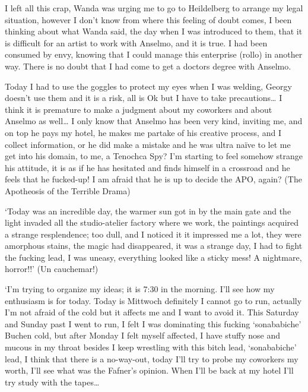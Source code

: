 \documentclass[smalldemyvopaper,11pt,twoside,onecolumn,openright,extrafontsizes]{memoir}
\begin{document}
I left all this crap, Wanda was urging me to go to Heildelberg to arrange my legal situation, however I don’t know from where this feeling of doubt comes, I been thinking about what Wanda said, the day when I was introduced to them, that it is difficult for an artist to work with Anselmo, and it is true. I had been consumed by envy, knowing that I could manage this enterprise (rollo) in another way. There is no doubt that I had come to get a doctors degree with Anselmo.

Today I had to use the goggles to protect my eyes when I was welding, Georgy doesn’t use them and it is a risk, all is Ok but I have to take precautions… I think it is premature to make a judgment about my coworkers and about Anselmo as well… I only know that Anselmo has been very kind, inviting me, and on top he pays my hotel, he makes me partake of his creative process, and I collect information, or he did make a mistake and he was ultra naïve to let me get into his domain, to me, a Tenochca Spy? I’m starting to feel somehow strange his attitude, it is as if he has hesitated and finds himself in a crossroad and he feels that he fucked-up! I am afraid that he is up to decide the APO, again? (The Apotheosis of the Terrible Drama)

‘Today was an incredible day, the warmer sun got in by the main gate and the light invaded all the studio-atelier factory where we work, the paintings acquired a strange resplendence; too dull, and I noticed it it impressed me a lot, they were amorphous stains, the magic had disappeared, it was a strange day, I had to fight the fucking lead, I was uneasy, everything looked like a sticky mess! A nightmare, horror!!’ (Un cauchemar!)

\ornamentbreak

‘I’m trying to organize my ideas; it is 7:30 in the morning. I’ll see how my enthusiasm is for today. Today is Mittwoch definitely I cannot go to run, actually I’m not afraid of the cold but it affects me and I want to avoid it. This Saturday and Sunday past I went to run, I felt I was dominating this fucking ‘sonababiche’ Buchen cold, but after Monday I felt myself affected, I have stuffy nose and mucous in my throat besides I keep wrestling with this bitch lead, ‘sonababiche’ lead, I think that there is a no-way-out, today I’ll try to probe my coworkers my worth, I’ll see what was the Fafner’s opinion. When I’ll be back at my hotel I’ll try study with the tapes…

\ornamentbreak
\end{document}
